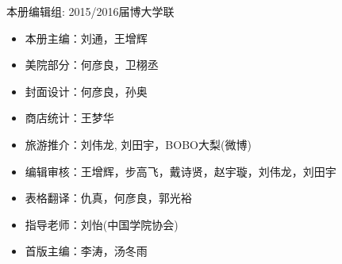 \begin{titlepage}
\newpage

\topmargin=0cm 

\vspace{3cm}\centerline{\Large 本册编辑组: 2015/2016届博大学联} 

\begin{itemize}
\item[] 本册主编：刘通，王增辉
\item[] 美院部分：何彦良，卫栩丞
\item[] 封面设计：何彦良，孙奥
\item[] 商店统计：王梦华
\item[] 旅游推介：刘伟龙, 刘田宇，BOBO大梨(微博)
\item[] 编辑审核：王增辉，步高飞，戴诗贤，赵宇璇，刘伟龙，刘田宇
\item[] 表格翻译：仇真，何彦良，郭光裕
\item[] 指导老师：刘怡(中国学院协会)
\item[] 首版主编：李涛，汤冬雨
\end{itemize}


\clearpage{\pagestyle{empty}\cleardoublepage}%
\end{titlepage}


\clearpage{\pagestyle{empty}\cleardoublepage}

{
\hypersetup{linkcolor=black}
\tableofcontents                        %

}
\clearpage{\pagestyle{empty}\cleardoublepage}
